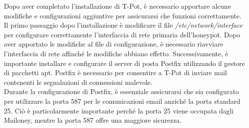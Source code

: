 Dopo aver completato l'installazione di T-Pot, è necessario apportare alcune modifiche e configurazioni aggiuntive per assicurarsi che funzioni correttamente.\\
Il primo passaggio dopo l'installazione è modificare il file \textit{/etc/network/interface} per configurare correttamente l'interfaccia di rete primaria dell'honeypot. Dopo aver apportato le modifiche al file di configurazione, è necessario riavviare l'interfaccia di rete affinché le modifiche abbiano effetto. Successivamente, è importante installare e configurare il server di posta Postfix utilizzando il gestore di pacchetti apt. Postfix è necessario per consentire a T-Pot di inviare mail contenenti le segnalazioni di connessioni malevole. \\
Durante la configurazione di Postfix, è essenziale assicurarsi che sia configurato per utilizzare la porta 587 per le comunicazioni email anziché la porta standard 25. Ciò è particolarmente importante perché la porta 25 viene occupata dagli Mailoney, mentre la porta 587 offre una maggiore sicurezza.

